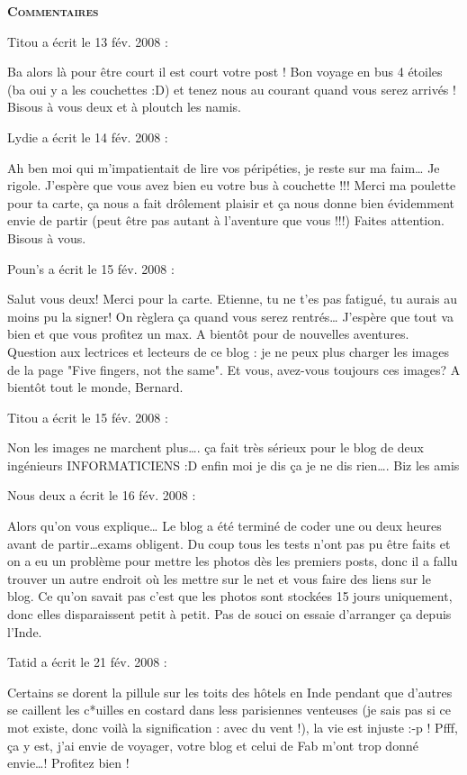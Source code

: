 \bigskip
\textbf{\textsc{Commentaires}}

\medskip
Titou a écrit le 13 fév. 2008 :
\begin{displayquote}
Ba alors là pour être court il est court votre post ! Bon voyage en bus 4 étoiles (ba oui y a les couchettes :D) et tenez nous au courant quand vous serez arrivés ! Bisous à vous deux et à ploutch les namis.
\end{displayquote}

\medskip
Lydie a écrit le 14 fév. 2008 :
\begin{displayquote}
Ah ben moi qui m'impatientait de lire vos péripéties, je reste sur ma faim\dots
Je rigole.
J'espère que vous avez bien eu votre bus à couchette !!!
Merci ma poulette pour ta carte, ça nous a fait drôlement plaisir et ça nous donne bien évidemment envie de partir (peut être pas autant à l'aventure que vous !!!)
Faites attention.
Bisous à vous.
\end{displayquote}

\medskip
Poun's a écrit le 15 fév. 2008 :
\begin{displayquote}
Salut vous deux! Merci pour la carte. Etienne, tu ne t'es pas fatigué, tu aurais au moins pu la signer! On règlera ça quand vous serez rentrés\dots
J'espère que tout va bien et que vous profitez un max.
A bientôt pour de nouvelles aventures.
Question aux lectrices et lecteurs de ce blog : je ne peux plus charger les images de la page "Five fingers, not the same". Et vous, avez-vous toujours ces images?
A bientôt tout le monde, Bernard.
\end{displayquote}

\medskip
Titou a écrit le 15 fév. 2008 :
\begin{displayquote}
Non les images ne marchent plus\dots. ça fait très sérieux pour le blog de deux ingénieurs INFORMATICIENS :D enfin moi je dis ça je ne dis rien\dots. Biz les amis
\end{displayquote}

\medskip
Nous deux a écrit le 16 fév. 2008 :
\begin{displayquote}
Alors qu'on vous explique\dots
Le blog a été terminé de coder une ou deux heures avant de partir\dots exams obligent. Du coup tous les tests n'ont pas pu être faits et on a eu un problème pour mettre les photos dès les premiers posts, donc il a fallu trouver un autre endroit où les mettre sur le net et vous faire des liens sur le blog. Ce qu'on savait pas c'est que les photos sont stockées 15 jours uniquement, donc elles disparaissent petit à petit. Pas de souci on essaie d'arranger ça depuis l'Inde.
\end{displayquote}

\medskip
Tatid a écrit le 21 fév. 2008 :
\begin{displayquote}
Certains se dorent la pillule sur les toits des hôtels en Inde pendant que d'autres se caillent les c*uilles en costard dans less parisiennes venteuses (je sais pas si ce mot existe, donc voilà la signification : avec du vent !), la vie est injuste :-p !
Pfff, ça y est, j'ai envie de voyager, votre blog et celui de Fab m'ont trop donné envie\dots ! Profitez bien !
\end{displayquote}

\vfill
